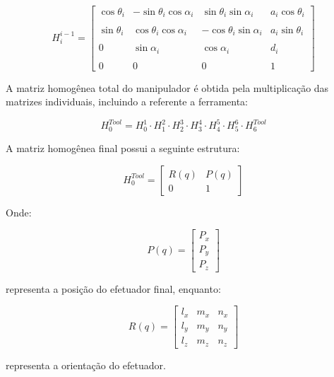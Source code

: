 \begin{equation}
H_i^ {i-1} =
\begin{bmatrix}
\cos\theta_i &
-\sin\theta_i \cos\alpha_i &
\sin\theta_i \sin\alpha_i &
a_i \cos\theta_i \\
\\
\sin\theta_i &
\cos\theta_i \cos\alpha_i &
-\cos\theta_i \sin\alpha_i &
a_i \sin\theta_i \\
\\
0 &
\sin\alpha_i &
\cos\alpha_i &
d_i \\
\\
0 & 0 & 0 & 1
\end{bmatrix}
\end{equation}

A matriz homogênea total do manipulador é obtida pela multiplicação das matrizes individuais, incluindo a referente a ferramenta:

\begin{equation}
H_0^{Tool} =
H_0^1
\cdot
H_1^2
\cdot
H_2^3
\cdot
H_3^4
\cdot
H_4^5
\cdot
H_5^6
\cdot
H_6^{Tool}
\end{equation}

A matriz homogênea final possui a seguinte estrutura:

\begin{equation}
H_0^{Tool} =
\begin{bmatrix}
R(q) & P(q) \\
0 & 1
\end{bmatrix}
\end{equation}

Onde:

\begin{equation}
P(q)=
\begin{bmatrix}
P_x \\
P_y \\
P_z
\end{bmatrix}
\end{equation}

representa a posição do efetuador final, enquanto:

\begin{equation}
R(q)=
\begin{bmatrix}
l_x & m_x & n_x \\
l_y & m_y & n_y \\
l_z & m_z & n_z
\end{bmatrix}
\end{equation}

representa a orientação do efetuador.

